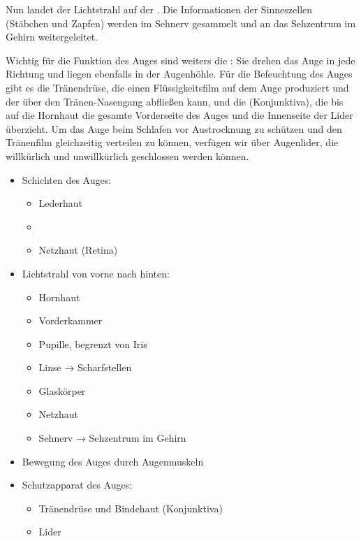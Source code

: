 {Nun landet der Lichtstrahl auf der . Die
Informationen der Sinneszellen (Stäbchen und Zapfen) werden
im Sehnerv gesammelt und an das Sehzentrum im Gehirn
weitergeleitet.

Wichtig für die Funktion des Auges sind weiters die
: Sie drehen das Auge in jede Richtung und
liegen ebenfalls in der Augenhöhle. Für die Befeuchtung des
Auges gibt es die Tränendrüse, die einen Flüssigkeitsfilm
auf dem Auge produziert und der über den Tränen-Nasengang
abfließen kann, und die  (Konjunktiva), die bis
auf die Hornhaut die gesamte Vorderseite des Auges und die
Innenseite der Lider überzieht. Um das Auge beim Schlafen
vor Austrocknung zu schützen und den Tränenfilm gleichzeitig
verteilen zu können, verfügen wir über Augenlider, die
willkürlich und unwillkürlich geschlossen werden können.
}{%
\begin{itemize}
  \item Schichten des Auges:
  \begin{itemize}
    \item Lederhaut 
    \item {}
    \item Netzhaut (Retina)
  \end{itemize}
  \item Lichtstrahl von vorne nach hinten:
  \begin{itemize}
    \item Hornhaut 
    \item Vorderkammer
    \item Pupille, begrenzt von Iris
    \item Linse → Scharfstellen
    \item Glaskörper
    \item Netzhaut
    \item Sehnerv → Sehzentrum im Gehirn
  \end{itemize}
  \item Bewegung des Auges durch Augenmuskeln
  \item Schutzapparat des Auges:
  \begin{itemize}
    \item Tränendrüse und Bindehaut (Konjunktiva)
    \item Lider
  \end{itemize}
\end{itemize}
}{}{}{}





